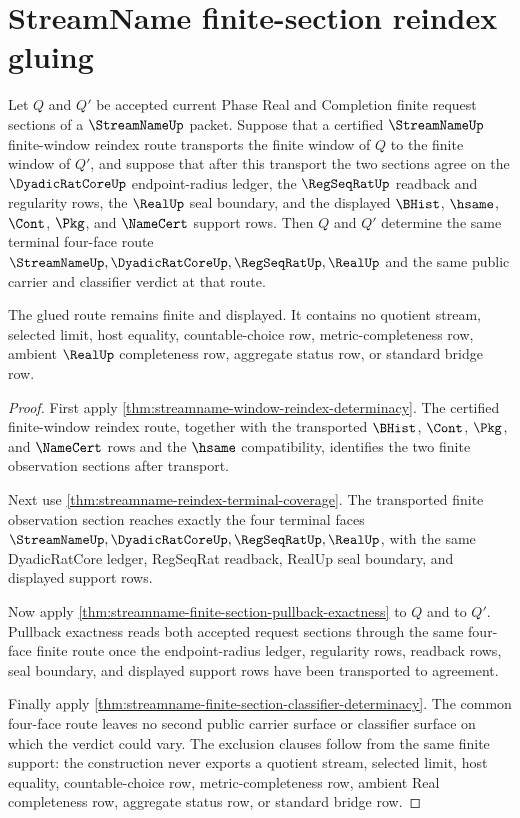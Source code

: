 \section{StreamName finite-section reindex gluing}
\label{sec:streamname-finite-section-reindex-gluing}

\begin{theorem}
\label{thm:streamname-finite-section-reindex-gluing}
Let $Q$ and $Q'$ be accepted current Phase Real and Completion finite request
sections of a $\StreamNameUp$ packet. Suppose that a certified
$\StreamNameUp$ finite-window reindex route transports the finite window of
$Q$ to the finite window of $Q'$, and suppose that after this transport the two
sections agree on the $\DyadicRatCoreUp$ endpoint-radius ledger, the
$\RegSeqRatUp$ readback and regularity rows, the $\RealUp$ seal boundary, and
the displayed $\BHist$, $\hsame$, $\Cont$, $\Pkg$, and $\NameCert$ support
rows. Then $Q$ and $Q'$ determine the same terminal four-face route
$\StreamNameUp,\DyadicRatCoreUp,\RegSeqRatUp,\RealUp$ and the same public
carrier and classifier verdict at that route.

The glued route remains finite and displayed. It contains no quotient stream,
selected limit, host equality, countable-choice row, metric-completeness row,
ambient $\RealUp$ completeness row, aggregate status row, or standard bridge
row.
\end{theorem}
\begin{proof}
First apply \autoref{thm:streamname-window-reindex-determinacy}. The certified
finite-window reindex route, together with the transported $\BHist$, $\Cont$,
$\Pkg$, and $\NameCert$ rows and the $\hsame$ compatibility, identifies the two
finite observation sections after transport.

Next use \autoref{thm:streamname-reindex-terminal-coverage}. The transported
finite observation section reaches exactly the four terminal faces
$\StreamNameUp,\DyadicRatCoreUp,\RegSeqRatUp,\RealUp$, with the same
DyadicRatCore ledger, RegSeqRat readback, RealUp seal boundary, and displayed
support rows.

Now apply \autoref{thm:streamname-finite-section-pullback-exactness} to $Q$
and to $Q'$. Pullback exactness reads both accepted request sections through
the same four-face finite route once the endpoint-radius ledger, regularity
rows, readback rows, seal boundary, and displayed support rows have been
transported to agreement.

Finally apply
\autoref{thm:streamname-finite-section-classifier-determinacy}. The common
four-face route leaves no second public carrier surface or classifier surface
on which the verdict could vary. The exclusion clauses follow from the same
finite support: the construction never exports a quotient stream, selected
limit, host equality, countable-choice row, metric-completeness row, ambient
Real completeness row, aggregate status row, or standard bridge row.
\end{proof}

